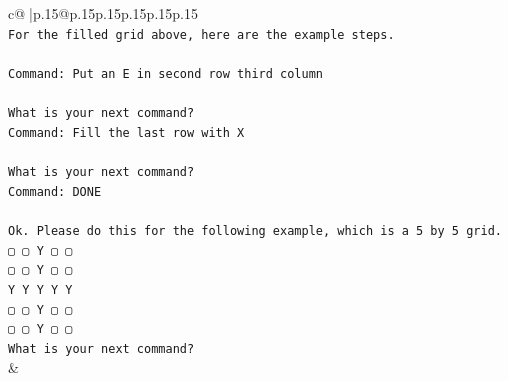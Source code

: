 \documentclass{article}
\begin{document}
{\begin{supertabular}{c@{$\;$}|p{.15\linewidth}@{}p{.15\linewidth}p{.15\linewidth}p{.15\linewidth}p{.15\linewidth}p{.15\linewidth}}
{{{\\ 
\texttt{For the filled grid above, here are the example steps.} \\
\\ 
\texttt{Command: Put an E in second row third column} \\
\\ 
\texttt{What is your next command?} \\
\texttt{Command: Fill the last row with X} \\
\\ 
\texttt{What is your next command?} \\
\texttt{Command: DONE} \\
\\ 
\texttt{Ok. Please do this for the following example, which is a 5 by 5 grid.} \\
\texttt{▢ ▢ Y ▢ ▢} \\
\texttt{▢ ▢ Y ▢ ▢} \\
\texttt{Y Y Y Y Y} \\
\texttt{▢ ▢ Y ▢ ▢} \\
\texttt{▢ ▢ Y ▢ ▢} \\
\texttt{What is your next command?} \\
            }
        }
    }
    & \\ \\


\end{supertabular}}
\end{document}
